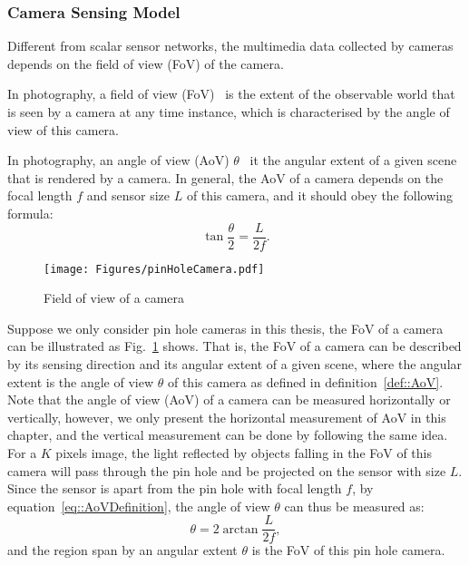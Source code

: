 \subsubsection{Camera Sensing Model}
Different from scalar sensor networks, the multimedia data collected by cameras depends on the field of view (FoV) of the camera.
\begin{mydef}
In photography, a field of view (FoV)~\cite{szeliski2010computer} is the extent of the observable world that is seen by a camera at any time instance, which is characterised by the angle of view of this camera.
\label{def::FoV}
\end{mydef}
\begin{mydef}
In photography, an angle of view (AoV) $\theta$~\cite{szeliski2010computer} it the angular extent of a given scene that is rendered by a camera.
In general, the AoV of a camera depends on the focal length $f$ and sensor size $L$ of this camera, and it should obey the following formula:
\begin{equation}
\tan \frac{\theta}{2} = \frac{L}{2f}.
\label{eq::AoVDefinition}
\end{equation}
\label{def::AoV}
\end{mydef}
%
\begin{figure}
\begin{center}
\texttt{[image: Figures/pinHoleCamera.pdf]}
\caption{\label{fig::fov}Field of view of a camera}
\end{center}
\end{figure}
%
Suppose we only consider pin hole cameras in this thesis, the FoV of a camera can be illustrated as Fig.~\ref{fig::fov} shows.
That is, the FoV of a camera can be described by its sensing direction and its angular extent of a given scene, where the angular extent is the angle of view $\theta$ of this camera as defined in definition~\ref{def::AoV}.
Note that the angle of view (AoV) of a camera can be measured horizontally or vertically, however, we only present the horizontal measurement of AoV in this chapter, and the vertical measurement can be done by following the same idea.
For a $K$ pixels image, the light reflected by objects falling in the FoV of this camera will pass through the pin hole and be projected on the sensor with size $L$.
Since the sensor is apart from the pin hole with focal length $f$, by equation~\eqref{eq::AoVDefinition}, the angle of view $\theta$ can thus be measured as:
\begin{equation}
\theta = 2 \arctan \frac{L}{2f},
\label{eq::AoV}
\end{equation}
and the region span by an angular extent $\theta$ is the FoV of this pin hole camera.
%

